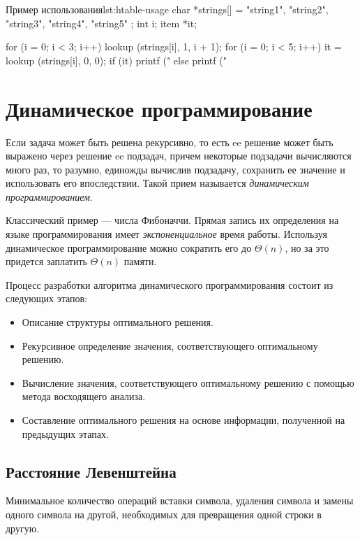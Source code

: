\begin{clst}{Пример использования}{lst:htable-usage}
char *strings[] = { "string1", "string2", "string3",
                    "string4", "string5" };
int i;
item *it;

for (i = 0; i < 3; i++)
  lookup (strings[i], 1, i + 1);
for (i = 0; i < 5; i++) {
  it = lookup (strings[i], 0, 0);
  if (it)
    printf ("%
  else
    printf ("%
}
\end{clst}

\section{Динамическое программирование}
\label{sec:dyn-programming}

Если задача может быть решена рекурсивно, то есть ee решение может быть выражено через решение ee подзадач, причем некоторые подзадачи вычисляются много раз, то разумно, единожды вычислив подзадачу, сохранить ее значение и использовать его впоследствии. Такой прием называется \emph{динамическим программированием}.

Классический пример --- числа Фибоначчи. Прямая запись их определения на языке программирования имеет \emph{экспоненциальное} время работы. Используя динамическое программирование можно сократить его до $\Theta(n)$, но за это придется заплатить $\Theta(n)$ памяти.

Процесс разработки алгоритма динамического программирования состоит из следующих этапов:
\begin{itemize}
  \item Описание структуры оптимального решения.
  \item Рекурсивное определение значения, соответствующего оптимальному решению.
  \item Вычисление значения, соответствующего оптимальному решению с помощью метода восходящего анализа.
  \item Составление оптимального решения на основе информации, полученной на предыдущих этапах.
\end{itemize}

\subsection{Расстояние Левенштейна}
Минимальное количество операций вставки символа, удаления символа и замены одного символа на другой, необходимых для превращения одной строки в другую.

